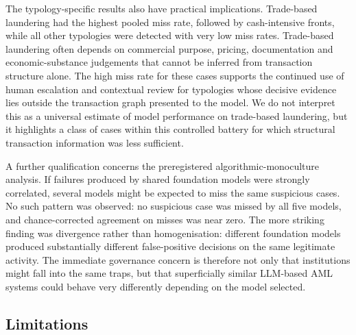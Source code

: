 \documentclass[pdflatex,sn-basic,Numbered]{sn-jnl}
\begin{document}
The typology-specific results also have practical implications. Trade-based laundering had the highest pooled miss rate, followed by cash-intensive fronts, while all other typologies were detected with very low miss rates. Trade-based laundering often depends on commercial purpose, pricing, documentation and economic-substance judgements that cannot be inferred from transaction structure alone. The high miss rate for these cases supports the continued use of human escalation and contextual review for typologies whose decisive evidence lies outside the transaction graph presented to the model. We do not interpret this as a universal estimate of model performance on trade-based laundering, but it highlights a class of cases within this controlled battery for which structural transaction information was less sufficient.

A further qualification concerns the preregistered algorithmic-monoculture analysis. If failures produced by shared foundation models were strongly correlated, several models might be expected to miss the same suspicious cases. No such pattern was observed: no suspicious case was missed by all five models, and chance-corrected agreement on misses was near zero. The more striking finding was divergence rather than homogenisation: different foundation models produced substantially different false-positive decisions on the same legitimate activity. The immediate governance concern is therefore not only that institutions might fall into the same traps, but that superficially similar LLM-based AML systems could behave very differently depending on the model selected.

\subsection{Limitations}
\end{document}
